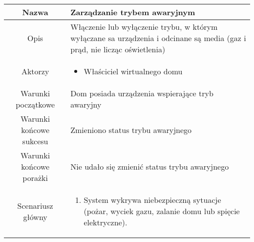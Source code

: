 \documentclass{article}
\begin{document}
\begin{enumerate}
\begin{enumerate}
				\begin{table}[H]
					\centering
					\begin{tabular}{|c|p{7cm}|}
						\hline
						Nazwa                   & Zarządzanie trybem awaryjnym                                                                                                                                                                                                                                                 \\
						\hline
						Opis                    & Włączenie lub wyłączenie trybu, w którym wyłączane sa urządzenia i odcinane są media (gaz i prąd, nie licząc oświetlenia)                                                                                                                                                    \\
						\hline
						Aktorzy                 & \begin{itemize}\item Właściciel wirtualnego domu\end{itemize}                                                                                                                                                                                                                \\
						\hline
						Warunki początkowe      & Dom posiada urządzenia wspierające tryb awaryjny                                                                                                                                                                                                                             \\
						\hline
						Warunki końcowe sukcesu & Zmieniono status trybu awaryjnego                                                                                                                                                                                                                                            \\
						\hline
						Warunki końcowe porażki & Nie udało się zmienić status trybu awaryjnego                                                                                                                                                                                                                                \\
						\hline
						Scenariusz główny       & \begin{enumerate}\item System wykrywa niebezpieczną sytuacje (pożar, wyciek gazu, zalanie domu lub spięcie elektryczne).


\end{enumerate}
\end{tabular}
\end{table}
\end{enumerate}
\end{enumerate}
\end{document}
